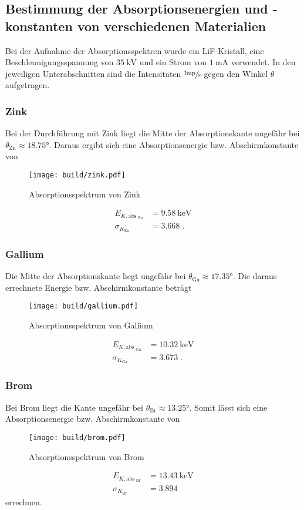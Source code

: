 \subsection{Bestimmung der Absorptionsenergien und -konstanten von verschiedenen Materialien}
Bei der Aufnahme der Absorptionsspektren wurde ein LiF-Kristall, eine Beschleunigungsspannung von $\SI{35}{\kilo\volt}$ und ein Strom von $\SI{1}{\milli\ampere}$
verwendet. 
In den jeweiligen Unterabschnitten sind die Intensitäten $\sfrac{\text{Imp}}{\si{\second}}$ gegen den Winkel $\theta$ aufgetragen.
\subsubsection{Zink}
Bei der Durchführung mit Zink liegt die Mitte der Absorptionskante ungefähr bei $\theta_\text{Zn} \approx \ang{18.75;;}$. Daraus ergibt sich eine Absorptionsenergie bzw. Abschirmkonstante von 
\begin{figure}
    \centering
    \caption{Absorptionsspektrum von Zink}
    \label{fig:zink}
    \texttt{[image: build/zink.pdf]}
\end{figure}
\begin{align*}
    E_{K, \text{abs}_\text{ Zn}}  &= \SI{9.58}{\kilo\electronvolt} \\
    \sigma_{K_\text{Zn}}         &= \num{3.668} \; \text{.}
\end{align*}
\FloatBarrier
\subsubsection{Gallium}
Die Mitte der Absorptionskante liegt ungefähr bei $\theta_\text{Ga} \approx \ang{17.35;;}$. Die daraus errechnete Energie bzw. Abschirmkonstante beträgt
\begin{figure}
    \centering
    \caption{Absorptionsspektrum von Gallium}
    \label{fig:Gallium}
    \texttt{[image: build/gallium.pdf]}
\end{figure}
\begin{align*}
    E_{K, \text{abs}_\text{ Ga}}  &= \SI{10.32}{\kilo\electronvolt} \\
    \sigma_{K_\text{Ga}}                &= \num{3.673} \; \text{.}
\end{align*}
\FloatBarrier
\subsubsection{Brom}
Bei Brom liegt die Kante ungefähr bei $\theta_\text{Br} \approx \ang{13.25;;}$. Somit lässt sich eine Absorptionsenergie bzw. Abschirmkonstante von 
\begin{figure}
    \centering
    \caption{Absorptionsspektrum von Brom}
    \label{fig:Brom}
    \texttt{[image: build/brom.pdf]}
\end{figure}
\begin{align*}
    E_{K, \text{abs}_\text{ Br}}  &= \SI{13.43}{\kilo\electronvolt} \\
    \sigma_{K_\text{Br}}                &= \num{3.894}
\end{align*}
errechnen.
\FloatBarrier
